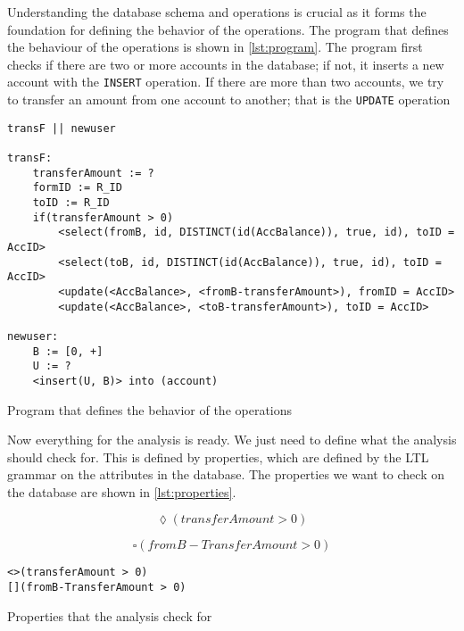 Understanding the database schema and operations is crucial as it forms the foundation for defining the behavior of the operations.
The program that defines the behaviour of the operations is shown in \autoref{lst:program}.
The program first checks if there are two or more accounts in the database; if not, it inserts a new account with the \texttt{INSERT} operation.
If there are more than two accounts, we try to transfer an amount from one account to another; that is the \texttt{UPDATE} operation


\begin{listing}[htb!]
    \begin{verbatim}
transF || newuser

transF:
    transferAmount := ?
    formID := R_ID
    toID := R_ID
    if(transferAmount > 0)
        <select(fromB, id, DISTINCT(id(AccBalance)), true, id), toID = AccID>
        <select(toB, id, DISTINCT(id(AccBalance)), true, id), toID = AccID>
        <update(<AccBalance>, <fromB-transferAmount>), fromID = AccID>
        <update(<AccBalance>, <toB-transferAmount>), toID = AccID>

newuser:
    B := [0, +]
    U := ?
    <insert(U, B)> into (account)
    \end{verbatim}
    \caption{Program that defines the behavior of the operations}
    \label{lst:program}
\end{listing}


Now everything for the analysis is ready.
We just need to define what the analysis should check for.
This is defined by properties, which are defined by the LTL grammar on the attributes in the database.
The properties we want to check on the database are shown in \autoref{lst:properties}.

\begin{equation}
    \lozenge (transferAmount > 0)
    \label{eq:ltl-eventual-property}
\end{equation}


\begin{equation}
    \square (fromB-TransferAmount > 0)
    \label{eq:ltl-always-property}
\end{equation}


\begin{listing}[htb!]
    \begin{verbatim}
<>(transferAmount > 0)
[](fromB-TransferAmount > 0)
    \end{verbatim}
    \caption{Properties that the analysis check for}
    \label{lst:properties}
\end{listing}


